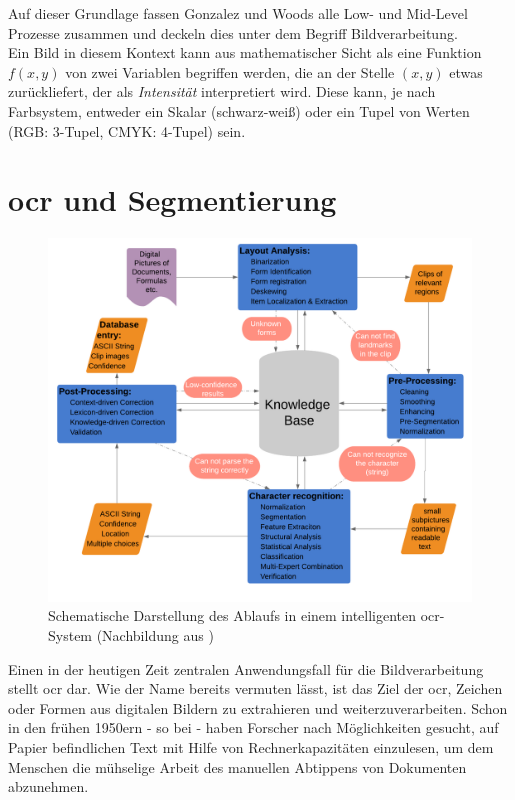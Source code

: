 		Auf dieser Grundlage fassen Gonzalez und Woods alle Low- und Mid-Level Prozesse zusammen und deckeln dies unter dem Begriff Bildverarbeitung. \\
		
		Ein Bild in diesem Kontext kann aus mathematischer Sicht als eine Funktion $f(x, y)$ von zwei Variablen begriffen werden, die an der Stelle $(x, y)$ etwas zurückliefert, der als \textit{Intensität} interpretiert wird. Diese kann, je nach Farbsystem, entweder ein Skalar (schwarz-weiß) oder ein Tupel von Werten (RGB: 3-Tupel, CMYK: 4-Tupel) sein. 
	
	
	\section{\gls{ocr} und Segmentierung}
	
		\begin{figure}[H]
			\centering
			\includegraphics[width=\linewidth]{Ablauf-OCR_Cheriet-et-al.pdf}
			\caption[typisches \gls{ocr}-Ablaufschema]{Schematische Darstellung des 
				Ablaufs in einem intelligenten \gls{ocr}-System (Nachbildung aus 
				\cite[Seite 7]{cher-et-al-ocr})}
			\label{fig:ocr-system}
		\end{figure}
	
		Einen in der heutigen Zeit zentralen Anwendungsfall für die Bildverarbeitung stellt \gls{ocr} dar. Wie der Name bereits vermuten lässt, ist das Ziel der \gls{ocr}, Zeichen oder Formen aus digitalen Bildern zu extrahieren und weiterzuverarbeiten. Schon in den frühen 1950ern - so bei \cite{cher-et-al-ocr} - haben Forscher nach Möglichkeiten gesucht, auf Papier befindlichen Text mit Hilfe von Rechnerkapazitäten einzulesen, um dem Menschen die mühselige Arbeit des manuellen Abtippens von Dokumenten abzunehmen.

